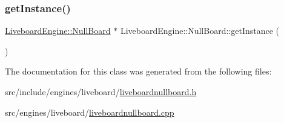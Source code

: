 \subsubsection{\texorpdfstring{getInstance()}{getInstance()}}
{\footnotesize\ttfamily \mbox{\hyperlink{classQRail_1_1LiveboardEngine_1_1NullBoard}{Liveboard\+Engine\+::\+Null\+Board}} $\ast$ Liveboard\+Engine\+::\+Null\+Board\+::get\+Instance (\begin{DoxyParamCaption}{ }\end{DoxyParamCaption})\hspace{0.3cm}{\ttfamily [static]}}



The documentation for this class was generated from the following files\+:\begin{DoxyCompactItemize}
\item 
src/include/engines/liveboard/\mbox{\hyperlink{liveboardnullboard_8h}{liveboardnullboard.\+h}}\item 
src/engines/liveboard/\mbox{\hyperlink{liveboardnullboard_8cpp}{liveboardnullboard.\+cpp}}\end{DoxyCompactItemize}
